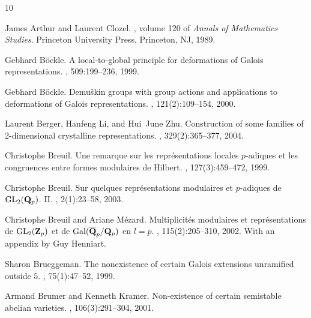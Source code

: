 \documentclass[12pt]{amsart}
\begin{document}
\nocite{*}

\begin{thebibliography}{10}



James Arthur and Laurent Clozel.
, volume 120 of {\em Annals of Mathematics Studies}.
\newblock Princeton University Press, Princeton, NJ, 1989.


Gebhard B{\"o}ckle.
\newblock A local-to-global principle for deformations of {G}alois
  representations.
, 509:199--236, 1999.

Gebhard B{\"o}ckle.
\newblock Demu\v skin groups with group actions and applications to
  deformations of {G}alois representations.
, 121(2):109--154, 2000.


Laurent Berger, Hanfeng Li, and Hui~June Zhu.
\newblock Construction of some families of 2-dimensional crystalline
  representations.
, 329(2):365--377, 2004.

Christophe Breuil.
\newblock Une remarque sur les repr\'esentations locales {$p$}-adiques et les
  congruences entre formes modulaires de {H}ilbert.
, 127(3):459--472, 1999.

Christophe Breuil.
\newblock Sur quelques repr\'esentations modulaires et {$p$}-adiques de {${\rm
  GL}\sb 2(\bold Q\sb p)$}. {II}.
, 2(1):23--58, 2003.

Christophe Breuil and Ariane M{\'e}zard.
\newblock Multiplicit\'es modulaires et repr\'esentations de {${\rm GL}\sb
  2({\bf Z}\sb p)$} et de {${\rm Gal}(\overline{\bf Q}\sb p/{\bf Q}\sb p)$} en
  {$l=p$}.
, 115(2):205--310, 2002.
\newblock With an appendix by Guy Henniart.

Sharon Brueggeman.
\newblock The nonexistence of certain {G}alois extensions unramified outside
  {$5$}.
, 75(1):47--52, 1999.

Armand Brumer and Kenneth Kramer.
\newblock Non-existence of certain semistable abelian varieties.
, 106(3):291--304, 2001.



\end{thebibliography}
\end{document}
